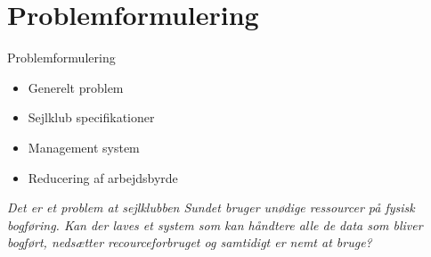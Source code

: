 \section{Problemformulering}

\begin{frame}{Problemformulering}
  
  \begin{itemize}
    \item Generelt problem
    
    \item Sejlklub specifikationer
    
    \item Management system
    
    \item Reducering af arbejdsbyrde
    
  \end{itemize}
\textit{Det er et problem at sejlklubben Sundet bruger unødige ressourcer på fysisk bogføring.
Kan der laves et system som kan håndtere alle de data som bliver bogført, nedsætter
recourceforbruget og samtidigt er nemt at bruge?}
\end{frame}
